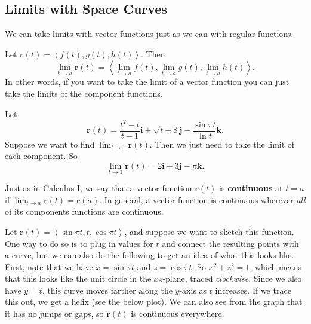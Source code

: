 \documentclass[10pt,]{book}
\newcommand{\terminology}[1]{\textbf{#1}}
\theoremstyle{ptxplainnotitle}
\theoremstyle{ptxplaintitle}
\theoremstyle{ptxplainnotitle}
\theoremstyle{ptxplaintitle}
\theoremstyle{ptxplainnotitle}
\theoremstyle{ptxplaintitle}
\theoremstyle{ptxdefinitionnotitle}
\theoremstyle{ptxdefinitiontitle}
\theoremstyle{ptxdefinitionnotitle}
\theoremstyle{ptxdefinitiontitle}
\theoremstyle{ptxdefinitionnotitle}
\theoremstyle{ptxdefinitiontitle}
\theoremstyle{ptxdefinitionnotitle}
\theoremstyle{ptxdefinitiontitle}
\theoremstyle{ptxdefinitionnotitle}
\theoremstyle{ptxdefinitiontitle}
\numberwithin{equation}{section}
\newcommand{\vv}[1]{\mathbf{#1}}
\newcommand{\dotprod}[1]{\left\langle #1 \right\rangle}
\begin{document}
\subsection[{Limits with Space Curves}]{Limits with Space Curves}\label{limits-with-space-curves}
\hypertarget{p-908}{}%
We can take limits with vector functions just as we can with regular functions.%
\par
\hypertarget{p-909}{}%
Let \(\vv{r}(t) = \dotprod{f(t),g(t),h(t)}\). Then%
%
\begin{equation}
\lim_{t\to a}\vv{r}(t) = \dotprod{\lim_{t\to a}f(t),\lim_{t\to a}g(t),\lim_{t\to a}h(t)}.\label{limits-vector-functions}
\end{equation}
\hypertarget{p-910}{}%
In other words, if you want to take the limit of a vector function you can just take the limits of the component functions.%
\begin{example}\label{example-limit-of-a-vector-function}
\hypertarget{p-911}{}%
Let%
%
\begin{equation*}
\vv{r}(t) = \frac{t^{2}-t}{t-1}\vv{i} + \sqrt{t+8}\vv{j} - \frac{\sin\pi t}{\ln t}\vv{k}.
\end{equation*}
\hypertarget{p-912}{}%
Suppose we want to find \(\lim_{t\to 1}\vv{r}(t)\). Then we just need to take the limit of each component. So%
%
\begin{equation*}
\lim_{t\to1}\vv{r}(t) = 2\vv{i}+3\vv{j} -\pi\vv{k}.
\end{equation*}
\end{example}
\hypertarget{p-913}{}%
Just as in Calculus I, we say that a vector function \(\vv{r}(t)\) is \terminology{continuous} at \(t=a\) if \(\lim_{t\to a}\vv{r}(t) = \vv{r}(a)\). In general, a vector function is continuous wherever \emph{all} of its components functions are continuous.%
\begin{example}\label{example-a-horiztonal-helix}
\hypertarget{p-914}{}%
Let \(\vv{r}(t) = \dotprod{\sin\pi t, t, \cos\pi t}\), and suppose we want to sketch this function. One way to do so is to plug in values for \(t\) and connect the resulting points with a curve, but we can also do the following to get an idea of what this looks like. First, note that we have \(x = \sin\pi t\) and \(z=\cos\pi t\). So \(x^{2}+z^{2} = 1\), which means that this looks like the unit circle in the \(xz\)-plane, traced \emph{clockwise}. Since we also have \(y=t\), this curve moves farther along the \(y\)-axis as \(t\) increases. If we trace this out, we get a helix (see the below plot). We can also see from the graph that it has no jumps or gaps, so \(\vv{r}(t)\) is continuous everywhere.%
\end{example}
\end{document}
